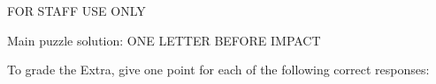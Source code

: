 \begin{puzzleSolutions}
FOR STAFF USE ONLY

Main puzzle solution: ONE LETTER BEFORE IMPACT

To grade the Extra, give one point for each of the following correct responses:

\begin{center}\small
\end{center}
\begin{center}\small
\end{center}
\begin{center}\small
\end{center}

\end{puzzleSolutions}
